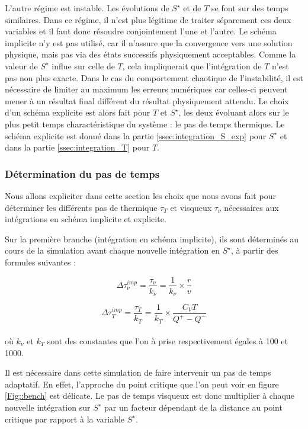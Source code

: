 L'autre régime est instable. Les évolutions de $S^\star$ et de $T$ se font sur
des temps similaires. Dans ce régime, il n'est plus légitime de traiter
séparement ces deux variables et il faut donc résoudre conjointement l'une et
l'autre. Le schéma implicite n'y est pas utilisé, car il n'assure que la
convergence vers une solution physique, mais pas via des états successifs
physiquement acceptables. Comme la valeur de $S^\star$ influe sur celle de $T$,
cela impliquerait que l'intégration de $T$ n'est pas non plus exacte. Dans le
cas du comportement chaotique de l'instabilité, il est nécessaire de limiter au
maximum les erreurs numériques car celles-ci peuvent mener à un résultat final
différent du résultat physiquement attendu. Le choix d'un schéma explicite est
alors fait pour $T$ et $S^\star$, les deux évoluant alors sur le plus petit
temps charactéristique du système : le pas de temps thermique. Le schéma
explicite est donné dans la partie \ref{ssec:integration_S_exp} pour $S^\star$
et dans la partie \ref{ssec:integration_T} pour $T$.

\subsubsection{Détermination du pas de temps\label{sec::pas_de_temps}}

Nous allons expliciter dans cette section les choix que nous avons fait pour
déterminer les différents pas de thermique $\tau_T$ et visqueux $\tau_\nu$
nécessaires aux intégrations en schéma implicite et explicite.

Sur la première branche (intégration en schéma implicite), ils sont déterminés
au cours de la simulation avant chaque nouvelle intégration en $S^\star$, à
partir des formules suivantes : 

\begin{equation}
	\Delta \tau_\nu^{imp} = \frac{\tau_\nu}{k_{\nu}} = \frac{1}{k_{\nu}} \times \frac{r}{v}
\end{equation}

\begin{equation}
	\Delta \tau_{T}^{imp} = \frac{\tau_{T}}{k_{T}}= \frac{1}{k_{T}} \times \frac{C_{V} T}{Q^{+} - Q^{-}}
\end{equation} \\

où $k_{\nu}$ et $k_{T}$ sont des constantes que l'on à prise respectivement égales à 100 et 1000.

Il est nécessaire dans cette simulation de faire intervenir un pas de temps
adaptatif. En effet, l'approche du point critique que l'on peut voir en figure
\ref{Fig::bench} est délicate. Le pas de temps visqueux est donc multiplier à
chaque nouvelle intégration sur $S^\star$ par un facteur dépendant de la
distance au point critique par rapport à la variable $S^\star$. 


